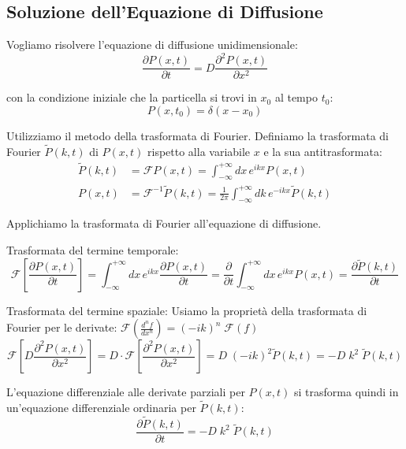 \subsection{Soluzione dell'Equazione di Diffusione}
Vogliamo risolvere l'equazione di diffusione unidimensionale:
\begin{equation}
\frac{\partial P(x,t)}{\partial t} = D \frac{\partial^2 P(x,t)}{\partial x^2}
\end{equation}

con la condizione iniziale che la particella si trovi in $x_0$ al tempo $t_0$:
\begin{equation}
P(x, t_0) = \delta(x-x_0)
\end{equation}

Utilizziamo il metodo della trasformata di Fourier. Definiamo la trasformata di Fourier $\tilde{P}(k,t)$ di $P(x,t)$ rispetto alla variabile $x$ e la sua antitrasformata:
\begin{equation}
\begin{aligned}
\tilde{P}(k,t) &= \mathcal{F}P(x,t) =\int_{-\infty}^{+\infty} dx \, e^{ikx} P(x,t)  \\
P(x,t) &= \mathcal{F}^{-1}\tilde{P}(k,t) = \frac{1}{2\pi} \int_{-\infty}^{+\infty} dk \, e^{-ikx} \tilde{P}(k,t)
\end{aligned}
\end{equation}

Applichiamo la trasformata di Fourier all'equazione di diffusione.

Trasformata del termine temporale:
\begin{equation}
\mathcal{F} \left[ \frac{\partial P(x,t)}{\partial t} \right] = \int_{-\infty}^{+\infty} dx \, e^{ikx}  \frac{\partial P(x,t)}{\partial t} = \frac{\partial}{\partial t} \int_{-\infty}^{+\infty} dx \, e^{ikx} P(x,t) =  \frac{\partial \tilde{P}(k,t)}{\partial t}
\end{equation}

Trasformata del termine spaziale: Usiamo la proprietà della trasformata di Fourier per le derivate:  $\mathcal{F} \left( \frac{d^n f}{dx^n} \right) = (-ik)^n \; \mathcal{F}(f)$
\begin{equation}
\mathcal{F} \left[ D \frac{\partial^2 P(x,t)}{\partial x^2} \right] = D \cdot \mathcal{F} \left[\frac{\partial^2 P(x,t)}{\partial x^2} \right] = D \; (-ik)^2 \tilde{P}(k,t) = -D\;  k^2 \; \tilde{P}(k,t)
\end{equation}

L'equazione differenziale alle derivate parziali per $P(x,t)$ si trasforma quindi in un'equazione differenziale ordinaria per $\tilde{P}(k,t)$:
\begin{equation}
\label{eq:eq_14}
\frac{\partial \tilde{P}(k,t)}{\partial t} = -D \; k^2 \; \tilde{P}(k,t)
\end{equation}

